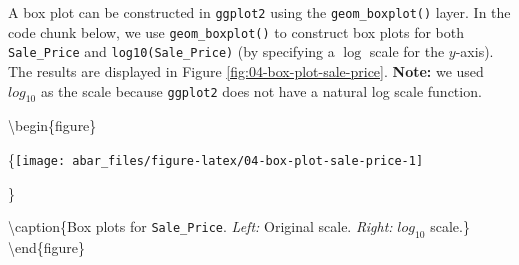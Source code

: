 \documentclass[]{book}
\newenvironment{Shaded}{\begin{snugshade}}{\end{snugshade}}
\newcommand{\DataTypeTok}[1]{\textcolor[rgb]{0.13,0.29,0.53}{#1}}
\newcommand{\DecValTok}[1]{\textcolor[rgb]{0.00,0.00,0.81}{#1}}
\newcommand{\KeywordTok}[1]{\textcolor[rgb]{0.13,0.29,0.53}{\textbf{#1}}}
\newcommand{\NormalTok}[1]{#1}
\newcommand{\OperatorTok}[1]{\textcolor[rgb]{0.81,0.36,0.00}{\textbf{#1}}}
\newcommand{\StringTok}[1]{\textcolor[rgb]{0.31,0.60,0.02}{#1}}
\theoremstyle{definition}
\theoremstyle{definition}
\theoremstyle{definition}
\theoremstyle{remark}
\begin{document}
A box plot can be constructed in \texttt{ggplot2} using the
\texttt{geom\_boxplot()} layer. In the code chunk below, we use
\texttt{geom\_boxplot()} to construct box plots for both
\texttt{Sale\_Price} and \texttt{log10(Sale\_Price)} (by specifying a
\(\log\) scale for the \(y\)-axis). The results are displayed in Figure
\ref{fig:04-box-plot-sale-price}. \textbf{Note:} we used \(log_{10}\) as
the scale because \texttt{ggplot2} does not have a natural log scale
function.

\begin{Shaded}
\end{Shaded}

\textbackslash{}begin\{figure\}

\{\centering \texttt{[image: abar\_files/figure-latex/04-box-plot-sale-price-1]}

\}

\textbackslash{}caption\{Box plots for \texttt{Sale\_Price}.
\emph{Left:} Original scale. \emph{Right:} \(log_{10}\)
scale.\}\label{fig:04-box-plot-sale-price} \textbackslash{}end\{figure\}
\end{document}
